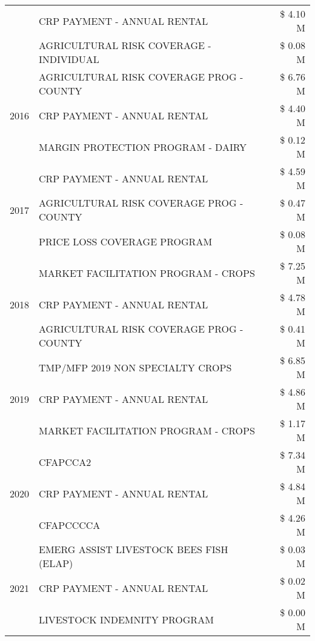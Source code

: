 \begin{tabular}{llr}
 & CRP PAYMENT - ANNUAL RENTAL & \$ 4.10 M \\
 & AGRICULTURAL RISK COVERAGE - INDIVIDUAL & \$ 0.08 M \\
\cline{1-3}
\multirow[t]{3}{*}{2016} & AGRICULTURAL RISK COVERAGE PROG - COUNTY & \$ 6.76 M \\
 & CRP PAYMENT - ANNUAL RENTAL & \$ 4.40 M \\
 & MARGIN PROTECTION PROGRAM - DAIRY & \$ 0.12 M \\
\cline{1-3}
\multirow[t]{3}{*}{2017} & CRP PAYMENT - ANNUAL RENTAL & \$ 4.59 M \\
 & AGRICULTURAL RISK COVERAGE PROG - COUNTY & \$ 0.47 M \\
 & PRICE LOSS COVERAGE PROGRAM & \$ 0.08 M \\
\cline{1-3}
\multirow[t]{3}{*}{2018} & MARKET FACILITATION PROGRAM - CROPS & \$ 7.25 M \\
 & CRP PAYMENT - ANNUAL RENTAL & \$ 4.78 M \\
 & AGRICULTURAL RISK COVERAGE PROG - COUNTY & \$ 0.41 M \\
\cline{1-3}
\multirow[t]{3}{*}{2019} & TMP/MFP 2019 NON SPECIALTY CROPS & \$ 6.85 M \\
 & CRP PAYMENT - ANNUAL RENTAL & \$ 4.86 M \\
 & MARKET FACILITATION PROGRAM - CROPS & \$ 1.17 M \\
\cline{1-3}
\multirow[t]{3}{*}{2020} & CFAPCCA2 & \$ 7.34 M \\
 & CRP PAYMENT - ANNUAL RENTAL & \$ 4.84 M \\
 & CFAPCCCCA & \$ 4.26 M \\
\cline{1-3}
\multirow[t]{3}{*}{2021} & EMERG ASSIST LIVESTOCK BEES FISH (ELAP) & \$ 0.03 M \\
 & CRP PAYMENT - ANNUAL RENTAL & \$ 0.02 M \\
 & LIVESTOCK INDEMNITY PROGRAM & \$ 0.00 M \\
\cline{1-3}
\bottomrule
\end{tabular}
